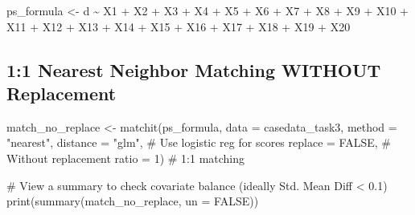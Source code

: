 \documentclass[
  letterpaper,
  DIV=11,
  numbers=noendperiod]{scrartcl}
\newenvironment{Shaded}{\begin{snugshade}}{\end{snugshade}}
\newcommand{\AttributeTok}[1]{\textcolor[rgb]{0.40,0.45,0.13}{#1}}
\newcommand{\CommentTok}[1]{\textcolor[rgb]{0.37,0.37,0.37}{#1}}
\newcommand{\ConstantTok}[1]{\textcolor[rgb]{0.56,0.35,0.01}{#1}}
\newcommand{\DecValTok}[1]{\textcolor[rgb]{0.68,0.00,0.00}{#1}}
\newcommand{\FunctionTok}[1]{\textcolor[rgb]{0.28,0.35,0.67}{#1}}
\newcommand{\NormalTok}[1]{\textcolor[rgb]{0.00,0.23,0.31}{#1}}
\newcommand{\OtherTok}[1]{\textcolor[rgb]{0.00,0.23,0.31}{#1}}
\newcommand{\SpecialCharTok}[1]{\textcolor[rgb]{0.37,0.37,0.37}{#1}}
\newcommand{\StringTok}[1]{\textcolor[rgb]{0.13,0.47,0.30}{#1}}
\begin{document}
\begin{Shaded}
\begin{Highlighting}[]
\NormalTok{ps\_formula }\OtherTok{\textless{}{-}}\NormalTok{ d }\SpecialCharTok{\textasciitilde{}}\NormalTok{ X1 }\SpecialCharTok{+}\NormalTok{ X2 }\SpecialCharTok{+}\NormalTok{ X3 }\SpecialCharTok{+}\NormalTok{ X4 }\SpecialCharTok{+}\NormalTok{ X5 }\SpecialCharTok{+}\NormalTok{ X6 }\SpecialCharTok{+}\NormalTok{ X7 }\SpecialCharTok{+}\NormalTok{ X8 }\SpecialCharTok{+}\NormalTok{ X9 }\SpecialCharTok{+}\NormalTok{ X10 }\SpecialCharTok{+}\NormalTok{ X11 }\SpecialCharTok{+} 
\NormalTok{X12 }\SpecialCharTok{+}\NormalTok{ X13 }\SpecialCharTok{+}\NormalTok{ X14 }\SpecialCharTok{+}\NormalTok{ X15 }\SpecialCharTok{+}\NormalTok{ X16 }\SpecialCharTok{+}\NormalTok{ X17 }\SpecialCharTok{+}\NormalTok{ X18 }\SpecialCharTok{+}\NormalTok{ X19 }\SpecialCharTok{+}\NormalTok{ X20}
\end{Highlighting}
\end{Shaded}

\subsection{1:1 Nearest Neighbor Matching WITHOUT
Replacement}\label{nearest-neighbor-matching-without-replacement}

\begin{Shaded}
\begin{Highlighting}[]
\NormalTok{match\_no\_replace }\OtherTok{\textless{}{-}} \FunctionTok{matchit}\NormalTok{(ps\_formula, }
                            \AttributeTok{data =}\NormalTok{ casedata\_task3, }
                            \AttributeTok{method =} \StringTok{"nearest"}\NormalTok{, }
                            \AttributeTok{distance =} \StringTok{"glm"}\NormalTok{,   }\CommentTok{\# Use logistic reg for scores}
                            \AttributeTok{replace =} \ConstantTok{FALSE}\NormalTok{,    }\CommentTok{\# Without replacement}
                            \AttributeTok{ratio =} \DecValTok{1}\NormalTok{)          }\CommentTok{\# 1:1 matching}

\CommentTok{\# View a summary to check covariate balance (ideally Std. Mean Diff \textless{} 0.1)}
\FunctionTok{print}\NormalTok{(}\FunctionTok{summary}\NormalTok{(match\_no\_replace, }\AttributeTok{un =} \ConstantTok{FALSE}\NormalTok{))}
\end{Highlighting}
\end{Shaded}
\end{document}
